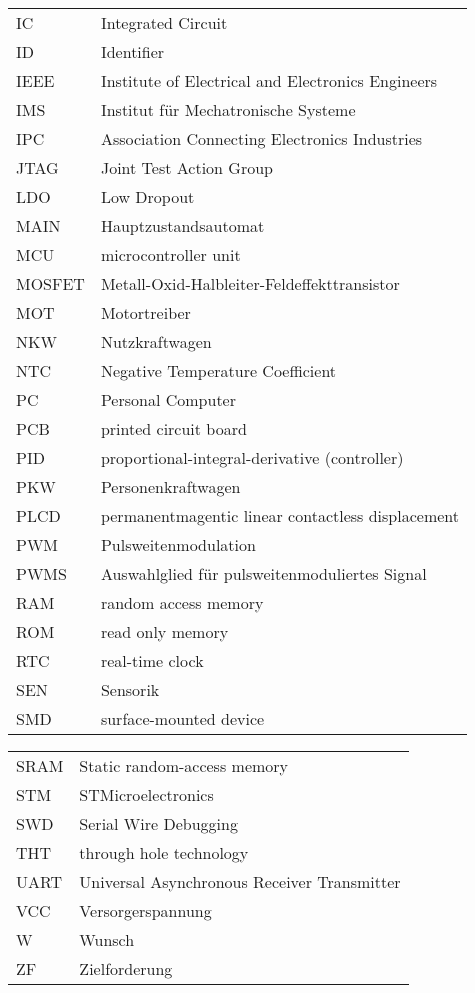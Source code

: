 \begin{table}[H]
\begin{tabular}{p{3cm}p{15cm}}
			IC\dotfill & Integrated Circuit\\
			ID\dotfill & Identifier\\
			IEEE\dotfill & Institute of Electrical and Electronics Engineers\\
			IMS\dotfill & Institut für Mechatronische Systeme\\
			IPC\dotfill & Association Connecting Electronics Industries\\
			JTAG\dotfill & Joint Test Action Group\\
			LDO\dotfill & Low Dropout\\
			MAIN\dotfill & Hauptzustandsautomat\\
			MCU\dotfill & microcontroller unit\\
			MOSFET\dotfill & Metall-Oxid-Halbleiter-Feldeffekttransistor\\
			MOT\dotfill & Motortreiber\\
			NKW\dotfill & Nutzkraftwagen\\
			NTC\dotfill & Negative Temperature Coefficient\\
			PC\dotfill & Personal Computer\\
			PCB\dotfill & printed circuit board\\
			PID\dotfill & proportional-integral-derivative (controller)\\
			PKW\dotfill & Personenkraftwagen\\
			PLCD\dotfill & permanentmagentic linear contactless displacement\\
			PWM\dotfill &  Pulsweitenmodulation\\
			PWMS\dotfill & Auswahlglied für pulsweitenmoduliertes Signal\\
			RAM\dotfill & random access memory\\
			ROM\dotfill & read only memory\\
			RTC\dotfill & real-time clock\\
			SEN\dotfill & Sensorik\\
			SMD\dotfill & surface-mounted device\\
		\end{tabular}
		\label{Abkuerzung}
\end{table}
\begin{table}[H]
	\centering
		\begin{tabular}{p{3cm}p{15cm}}
			SRAM\dotfill & Static random-access memory\\
			STM\dotfill & STMicroelectronics\\
			SWD\dotfill & Serial Wire Debugging\\
			THT\dotfill & through hole technology\\
			UART\dotfill & Universal Asynchronous Receiver Transmitter\\
			VCC\dotfill & Versorgerspannung\\
			W\dotfill & Wunsch \\
			ZF\dotfill & Zielforderung\\
		\end{tabular}
		\label{Abkuerzung}
\end{table}


